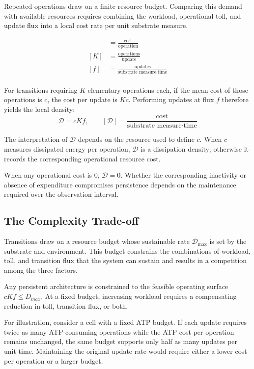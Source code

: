 Repeated operations draw on a finite resource budget. Comparing this demand with available resources requires combining the workload, operational toll, and update flux into a local cost rate per unit substrate measure.

\begin{align*}
[c] &= \frac{\text{cost}}{\text{operation}} \\[6pt]
[K] &= \frac{\text{operations}}{\text{update}} \\[6pt]
[f] &= \frac{\text{updates}}{\text{substrate measure} \cdot \text{time}} \\[6pt]
\end{align*}

For transitions requiring $K$ elementary operations each, if the mean cost of those operations is $c$, the cost per update is $K c$. Performing updates at flux $f$ therefore yields the local density:
\begin{equation}
\label{eq:dissipation_density}
    \mathcal{D}=cKf,
    \qquad
    [\mathcal{D}]
    =\frac{\text{cost}}
    {\text{substrate measure}\cdot\text{time}}
\end{equation}

The interpretation of $\mathcal{D}$ depends on the resource used to define $c$. When $c$ measures dissipated energy per operation, $\mathcal{D}$ is a dissipation density; otherwise it records the
corresponding operational resource cost.

When any operational cost is 0, $\mathcal{D}=0$. Whether the corresponding inactivity or absence of expenditure compromises persistence depends on the maintenance required over the observation interval.


\subsection{The Complexity Trade-off}
\label{subsec:complexity_tradeoff}

Transitions draw on a resource budget whose sustainable rate $\mathcal{D}_{\max}$ is set by the substrate and environment. This budget constrains the combinations of workload, toll, and transition flux that the system can sustain and results in a competition among the three factors.

Any persistent architecture is constrained to the feasible operating surface $cKf \le D_{max}$. At a fixed budget, increasing workload requires a compensating reduction in toll, transition flux, or both.

For illustration, consider a cell with a fixed ATP budget. If each update requires twice as many ATP-consuming operations while the ATP cost per operation remains unchanged, the same budget supports only half as many updates per unit time. Maintaining the original update rate would require either a lower cost per operation or a larger budget.

